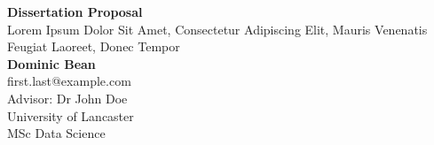 \documentclass{article}
\begin{document}

	\begin{center}
    
		\LARGE{\textbf{Dissertation Proposal}} \\
        \vspace{1em}
        \Large{Lorem Ipsum Dolor Sit Amet, Consectetur Adipiscing Elit, Mauris Venenatis Feugiat Laoreet, Donec Tempor} \\
        \vspace{1em}
        \normalsize\textbf{Dominic Bean} \\
        \normalsize{first.last@example.com} \\
        \vspace{1em}
        \normalsize{Advisor: Dr John Doe} \\
        \vspace{1em}
        \normalsize{University of Lancaster} \\
        \normalsize{MSc Data Science}
     
	\end{center}
	
    
    \begin{normalsize}
    
        
        
        
        
        
        
        
    \end{normalsize}

    
    
    
  
\end{document}
